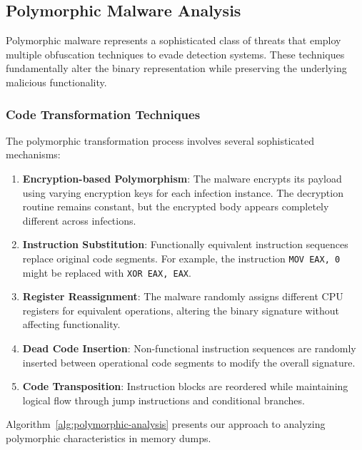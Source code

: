 \subsection{Polymorphic Malware Analysis}
\label{subsec:polymorphic-analysis}

Polymorphic malware represents a sophisticated class of threats that employ multiple obfuscation techniques to evade detection systems. These techniques fundamentally alter the binary representation while preserving the underlying malicious functionality.

\subsubsection{Code Transformation Techniques}

The polymorphic transformation process involves several sophisticated mechanisms:

\begin{enumerate}
    \item \textbf{Encryption-based Polymorphism}: The malware encrypts its payload using varying encryption keys for each infection instance. The decryption routine remains constant, but the encrypted body appears completely different across infections.
    
    \item \textbf{Instruction Substitution}: Functionally equivalent instruction sequences replace original code segments. For example, the instruction \texttt{MOV EAX, 0} might be replaced with \texttt{XOR EAX, EAX}.
    
    \item \textbf{Register Reassignment}: The malware randomly assigns different CPU registers for equivalent operations, altering the binary signature without affecting functionality.
    
    \item \textbf{Dead Code Insertion}: Non-functional instruction sequences are randomly inserted between operational code segments to modify the overall signature.
    
    \item \textbf{Code Transposition}: Instruction blocks are reordered while maintaining logical flow through jump instructions and conditional branches.
\end{enumerate}

Algorithm~\ref{alg:polymorphic-analysis} presents our approach to analyzing polymorphic characteristics in memory dumps.

